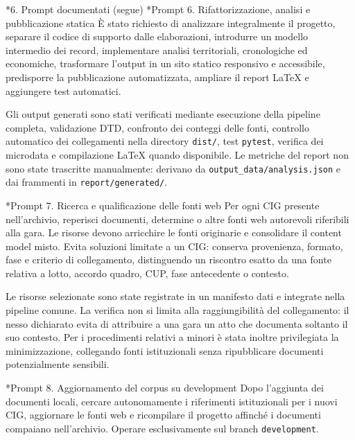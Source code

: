 \documentclass[10pt,a4paper]{article}
\makeatletter
\newcommand{\code}[1]{\texttt{#1}}
\renewcommand\section{\@startsection{section}{1}{0pt}{8pt}{4pt}{\large\bfseries}}
\renewcommand\subsection{\@startsection{subsection}{2}{0pt}{6pt}{2pt}{\normalsize\bfseries}}
\makeatother
\begin{document}
\newpage
\section*{6. Prompt documentati (segue)}
\subsection*{Prompt 6. Rifattorizzazione, analisi e pubblicazione statica}
È stato richiesto di analizzare integralmente il progetto, separare il codice di supporto dalle elaborazioni, introdurre un modello intermedio dei record, implementare analisi territoriali, cronologiche ed economiche, trasformare l'output in un sito statico responsivo e accessibile, predisporre la pubblicazione automatizzata, ampliare il report LaTeX e aggiungere test automatici.

Gli output generati sono stati verificati mediante esecuzione della pipeline completa, validazione DTD, confronto dei conteggi delle fonti, controllo automatico dei collegamenti nella directory \code{dist/}, test \code{pytest}, verifica dei microdata e compilazione LaTeX quando disponibile. Le metriche del report non sono state trascritte manualmente: derivano da \code{output\_data/analysis.json} e dai frammenti in \code{report/generated/}.

\subsection*{Prompt 7. Ricerca e qualificazione delle fonti web}
Per ogni CIG presente nell’archivio, reperisci documenti, determine o altre fonti web autorevoli riferibili alla gara. Le risorse devono arricchire le fonti originarie e consolidare il content model misto. Evita soluzioni limitate a un CIG: conserva provenienza, formato, fase e criterio di collegamento, distinguendo un riscontro esatto da una fonte relativa a lotto, accordo quadro, CUP, fase antecedente o contesto.

Le risorse selezionate sono state registrate in un manifesto dati e integrate nella pipeline comune. La verifica non si limita alla raggiungibilità del collegamento: il nesso dichiarato evita di attribuire a una gara un atto che documenta soltanto il suo contesto. Per i procedimenti relativi a minori è stata inoltre privilegiata la minimizzazione, collegando fonti istituzionali senza ripubblicare documenti potenzialmente sensibili.

\subsection*{Prompt 8. Aggiornamento del corpus su development}
Dopo l’aggiunta dei documenti locali, cercare autonomamente i riferimenti istituzionali per i nuovi CIG, aggiornare le fonti web e ricompilare il progetto affinché i documenti compaiano nell’archivio. Operare esclusivamente sul branch \code{development}.
\end{document}
